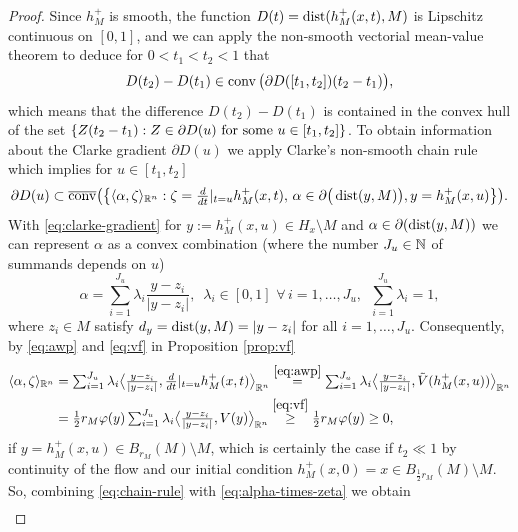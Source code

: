 \begin{proof}
Since $h_M^+$ is smooth, the function $D(t)=\operatorname{dist}(h_M^+(x,t),M)$ is
Lipschitz continuous on $[0,1]$, and we can apply the non-smooth
vectorial mean-value theorem \cite[Proposition 2.6.5]{clarke_1990} to deduce
for $0<t_1<t_2<1$ that
\begin{equation}\label{eq:mean-value}
D(t_2)-D(t_1)\in\operatorname{conv}\big(\partial D([t_1,t_2])(t_2-t_1)\big),
\end{equation}
which means that the difference $D(t_2)-D(t_1)$ is contained in the convex hull of the 
set $\{Z(t_2-t_1):Z\in\partial D(u)\,\,\textnormal{for some $u\in [t_1,t_2]$}\}$.
To obtain information about the Clarke gradient $\partial D(u)$ we apply
Clarke's non-smooth chain rule \cite[Theorem~2.3.9]{clarke_1990} which implies
for $u\in[t_1,t_2]$
\begin{equation}\label{eq:chain-rule}
\textstyle
\partial D(u)\subset\overline{\conv}\big(\big\{\langle\alpha,\zeta\rangle_{\R^n}:
\zeta=\frac{d}{dt}|_{t=u}h_M^+(x,t),\,\alpha\in\partial\big(\dist(%
y,M)\big)
{},y=h_M^+(x,u)\big\}\big).
\end{equation}
With \eqref{eq:clarke-gradient} for $y:=h_M^+(x,u)\in H_x\setminus M$ and
$\alpha\in\partial(\operatorname{dist}(y,M))$ we can represent $\alpha$ as a convex combination
(where the number $J_u\in\mathbb{N}$ of summands depends on $u$)
$$
\textstyle
\alpha=\sum_{i=1}^{J_u}\lambda_i\frac{y-z_i}{|y-z_i|},\,\,\,
\lambda_i\in [0,1]\,\,\forall\,
i=1,\ldots,J_u,\,\,\,
\sum_{i=1}^{J_u} \lambda_i=1,
$$
where $z_i\in M$ satisfy $d_y=\operatorname{dist}(y,M)=|y-z_i|$ for all $i=1,\ldots,J_u.$
Consequently, by \eqref{eq:awp} and \eqref{eq:vf} in Proposition \ref{prop:vf}
\begin{align}\label{eq:alpha-times-zeta}
\langle\alpha,\zeta\rangle_{\mathbb{R}^n}&
\textstyle
=\sum_{i=1}^{J_u}\lambda_i\big\langle
\frac{y-z_i}{|y-z_i|},\frac{d}{dt}|_{t=u}h_M^+(x,t)\big\rangle_{\mathbb{R}^n}
\overset{\eqref{eq:awp}}{=}
\sum_{i=1}^{J_u}\lambda_i\big\langle\frac{y-z_i}{|y-z_i|},\tilde{V}(h_M^+(x,u))
\big\rangle_{\mathbb{R}^n}\notag\\
&\textstyle
=\frac12 r_M\varphi(y)\sum_{i=1}^{J_u}\lambda_i\big\langle\frac{y-z_i}{|y-z_i|},
{V}(y)\big\rangle_{\mathbb{R}^n}\overset{\eqref{eq:vf}}{\ge}\frac12 r_M\varphi(y)\ge 0,
\end{align}
if $y=h_M^+(x,u)\in B_{r_M}(M)\setminus M$, which is certainly the case
if $t_2\ll 1$ by continuity of the flow and our initial condition 
$h_M^+(x,0)=x\in B_{\frac12{r_M}}(M)\setminus M$. So, combining \eqref{eq:chain-rule}
with \eqref{eq:alpha-times-zeta} we obtain 
\begin{align}

\end{align}
\end{proof}
